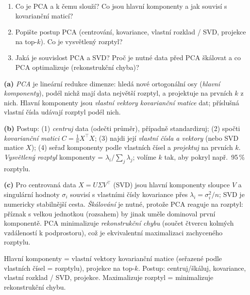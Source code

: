 \begin{zadani}
\begin{enumerate}[label=(\alph*)]
  \item {} Co je PCA a k čemu slouží? Co jsou hlavní komponenty a jak souvisí s kovarianční maticí?
  \item {} Popište postup PCA (centrování, kovariance, vlastní rozklad / SVD, projekce na top-$k$). Co je vysvětlený rozptyl?
  \item {} Jaká je souvislost PCA a SVD? Proč je nutné data před PCA škálovat a co PCA optimalizuje (rekonstrukční chyba)?
\end{enumerate}
\end{zadani}

\begin{reseni}
\textbf{(a)} \emph{PCA} je lineární redukce dimenze: hledá nové ortogonální osy (\emph{hlavní komponenty}), podél nichž mají data největší rozptyl, a projektuje na prvních $k$ z nich. Hlavní komponenty jsou \emph{vlastní vektory kovarianční matice} dat; příslušná vlastní čísla udávají rozptyl podél nich.

\textbf{(b)} Postup: (1) \emph{centruj} data (odečti průměr), případně standardizuj; (2) spočti \emph{kovarianční matici} $C=\tfrac1n X^{\!\top}X$; (3) najdi její \emph{vlastní čísla a vektory} (nebo SVD matice $X$); (4) seřaď komponenty podle vlastních čísel a \emph{projektuj} na prvních $k$. \emph{Vysvětlený rozptyl} komponenty = $\lambda_i/\sum_j\lambda_j$; volíme $k$ tak, aby pokryl např.\ 95\,\% rozptylu.

\textbf{(c)} Pro centrovaná data $X=U\Sigma V^{\!\top}$ (SVD) jsou hlavní komponenty sloupce $V$ a singulární hodnoty $\sigma_i$ souvisí s vlastními čísly kovariance přes $\lambda_i=\sigma_i^2/n$; SVD je numericky stabilnější cesta. \emph{Škálování} je nutné, protože PCA reaguje na rozptyl: příznak s velkou jednotkou (rozsahem) by jinak uměle dominoval první komponentě. PCA minimalizuje \emph{rekonstrukční chybu} (součet čtvercu kolmých vzdáleností k podprostoru), což je ekvivalentní maximalizaci zachyceného rozptylu.
\end{reseni}

\begin{jadro}
Hlavní komponenty = vlastní vektory kovarianční matice (seřazené podle vlastních čísel = rozptylu), projekce na top-$k$. Postup: centruj/škáluj, kovariance, vlastní rozklad / SVD, projekce. Maximalizuje rozptyl = minimalizuje rekonstrukční chybu.
\end{jadro}

